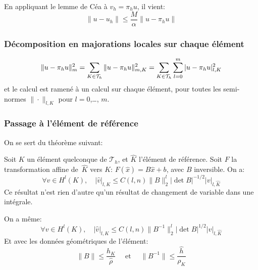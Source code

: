 En appliquant le lemme de Céa à $v_h=\pi_hu$, il vient:
\begin{equation}
\|u-u_h\|\le\dfrac{M}{\alpha}\|u-\pi_hu\|
\end{equation}

\medskip
\subsubsection{Décomposition en majorations locales sur chaque élément}

\begin{equation}
\|u-\pi_hu\|^2_m=\displaystyle\sum_{K\in\mathcal{T}_h}\|u-\pi_hu\|^2_{m,K}=\displaystyle\sum_{K\in\mathcal{T}_h}\displaystyle\sum_{l=0}^m |u-\pi_hu|^2_{l,K}
\end{equation}
et le calcul est ramené à un calcul sur chaque élément, pour toutes les semi-normes
$\|\cdot\|_{l,K}$ pour $l=0$,\ldots, $m$.

\medskip
\subsubsection{Passage à l'élément de référence}

On se sert du théorème suivant:

\begin{theoreme}
Soit $K$ un élément quelconque de $\mathcal{T}_h$, et $\hat{K}$ l'élément de
référence. Soit $F$ la transformation affine de~$\hat{K}$ vers $K$:
$F(\hat{x}) = B\hat{x} + b$, avec $B$ inversible. On a:
\begin{equation}
\forall v\in H^l(K), \quad
|\hat{v}|_{l,K} \le C(l,n) \|B\|_2^l |\det B|^{-1/2} |v|_{l,\hat{K}}
\end{equation}
Ce résultat n'est rien d'autre qu'un résultat de changement de variable
dans une intégrale.
\end{theoreme}
On a même:
\begin{equation}
\forall v\in H^l(K), \quad
|\hat{v}|_{l,K} \le C(l,n) \|B^{-1}\|_2^l |\det B|^{1/2} |v|_{l,\hat{K}}
\end{equation}
\medskip
%
Et avec les données géométriques de l'élément:
\begin{equation}
\|B\|\le\dfrac{h_K}{\hat{\rho}} \quad\text{ et }\quad
\|B^{-1}\|\le\dfrac{\hat{h}}{\rho_K}
\end{equation}

